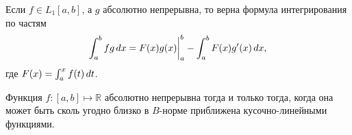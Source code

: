 
\begin{to_con}
    Если $f \in L_1 [a, b]$, а $g$ абсолютно непрерывна, то верна формула интегрирования по частям
    \begin{equation*}
        \int_a^b f g \, d x = F(x) g(x) \bigg|_a^b
        - \int_a^b F(x) g'(x) \, d x,
    \end{equation*}
    где $F(x) = \int_a^x f(t) \, d t$.
\end{to_con}


\begin{to_lem}
    Функция $f \colon [a, b] \mapsto \mathbb{R}$ абсолютно непрерывна тогда и только тогда, когда она может быть сколь угодно близко в $B$-норме приближена кусочно-линейными функциями.
\end{to_lem}


